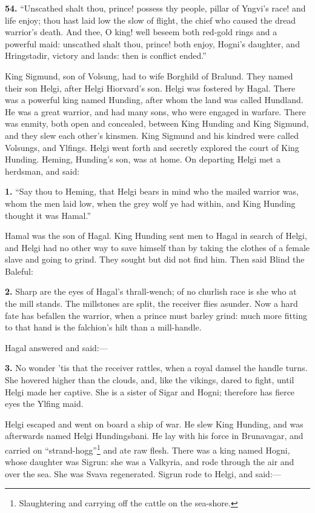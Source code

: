 \textbf{54.} ``Unscathed shalt thou, prince! possess thy people, pillar of
Yngvi's race! and life enjoy; thou hast laid low the slow of flight,
the chief who caused the dread warrior's death. And thee, O king! well
beseem both red-gold rings and a powerful maid: unscathed shalt thou,
prince! both enjoy, Hogni's daughter, and Hringstadir, victory and
lands: then is conflict ended.''


King Sigmund, son of Volsung, had to wife Borghild of Bralund. They
named their son Helgi, after Helgi Hiorvard's son. Helgi was fostered
by Hagal. There was a powerful king named Hunding, after whom the land
was called Hundland. He was a great warrior, and had many sons, who
were engaged in warfare. There was enmity, both open and concealed,
between King Hunding and King Sigmund, and they slew each other's
kinsmen. King Sigmund and his kindred were called Volsungs, and
Ylfings. Helgi went forth and secretly explored the court of King
Hunding. Heming, Hunding's son, was at home. On departing Helgi met a
herdsman, and said:

\textbf{1.} ``Say thou to Heming, that Helgi bears in mind who the mailed
warrior was, whom the men laid low, when the grey wolf ye had within,
and King Hunding thought it was Hamal.''

Hamal was the son of Hagal. King Hunding sent men to Hagal in search
of Helgi, and Helgi had no other way to save himself than by taking
the clothes of a female slave and going to grind. They sought but did
not find him. Then said Blind the Baleful:

\textbf{2.} Sharp are the eyes of Hagal's thrall-wench; of no churlish race
is she who at the mill stands. The millstones are split, the receiver
flies asunder. Now a hard fate has befallen the warrior, when a prince
must barley grind: much more fitting to that hand is the falchion's
hilt than a mill-handle.

Hagal answered and said:—

\textbf{3.} No wonder 'tis that the receiver rattles, when a royal damsel the
handle turns. She hovered higher than the clouds, and, like the
vikings, dared to fight, until Helgi made her captive. She is a sister
of Sigar and Hogni; therefore has fierce eyes the Ylfing maid.

Helgi escaped and went on board a ship of war. He slew King Hunding,
and was afterwards named Helgi Hundingsbani. He lay with his force in
Brunavagar, and carried on ``strand-hogg''\footnote{Slaughtering and carrying off the cattle on the
sea-shore.} and ate raw flesh. There
was a king named Hogni, whose daughter was Sigrun: she was a Valkyria,
and rode through the air and over the sea. She was Svava regenerated.
Sigrun rode to Helgi, and said:—

